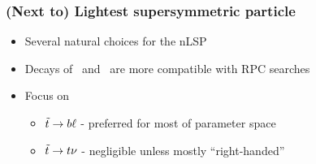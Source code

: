\documentclass[10pt, svgnames]{beamer}
\begin{document}
\begin{frame}
  \frametitle{(Next to) Lightest supersymmetric particle}
  \begin{itemize}
    \item Several natural choices for the nLSP
    \item Decays of \sbottom\ and \stau\ are more compatible with RPC searches
    \item Focus on \stop
      \begin{itemize}
        \item {\color{nice_blue}$\tilde{t} \rightarrow b\ell$} - preferred for most of
          parameter space
        \item $\tilde{t} \rightarrow t\nu$ - negligible unless mostly ``right-handed'' \stop
      \end{itemize}
  \end{itemize}

  \vspace{1ex}


\end{frame}
\end{document}
